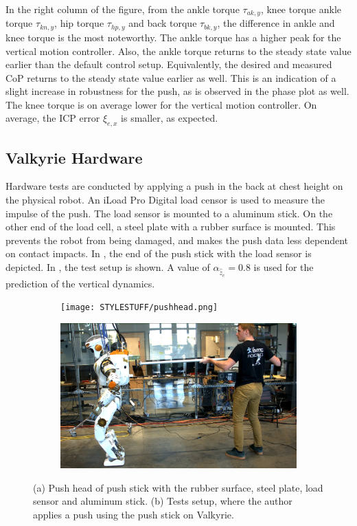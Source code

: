 In the right column of the figure, from the ankle torque $\tau_{ak,y}$, knee torque ankle torque $\tau_{kn,y}$, hip torque $\tau_{hp,y}$ and back torque $\tau_{bk,y}$, the difference in ankle and knee torque is the most noteworthy. The ankle torque has a higher peak for the vertical motion controller. Also, the ankle torque returns to the steady state value earlier than the default control setup. Equivalently, the desired and measured \ac{CoP} returns to the steady state value earlier as well. This is an indication of a slight increase in robustness for the push, as is observed in the phase plot as well. The knee torque is on average lower for the vertical motion controller. On average, the \ac{ICP} error $\xi_{e,x}$ is smaller, as expected.

\subsection{Valkyrie Hardware} 
Hardware tests are conducted by applying a push in the back at chest height on the physical robot. An iLoad Pro Digital load censor \cite{iload} is used to measure the impulse of the push. The load sensor is mounted to a aluminum stick. On the other end of the load cell, a steel plate with a rubber surface is mounted. This prevents the robot from being damaged, and makes the push data less dependent on contact impacts. In , the end of the push stick with the load sensor is depicted. In , the test setup is shown. A value of $\alpha_{\hat{\ddot{z}}_{c}}=0.8$ is used for the prediction of the vertical dynamics. 
\begin{figure}
\centering
  \begin{subfigure}{0.495\textwidth}
  \centering
  \texttt{[image: STYLESTUFF/pushhead.png]}
   \caption{}
    \label{fig:pushhead}
  \end{subfigure}
  \begin{subfigure}{0.495\textwidth}
    \centering
  \includegraphics[width=.94\linewidth]{STYLESTUFF/authorpush.png}
  \caption{}
   \label{fig:authorpush}
  \end{subfigure}
  \caption{(a) Push head of push stick with the rubber surface, steel plate, load sensor and aluminum stick. (b) Tests setup, where the author applies a push using the push stick on Valkyrie.}
  \label{fig:pushsetup}
\end{figure}

